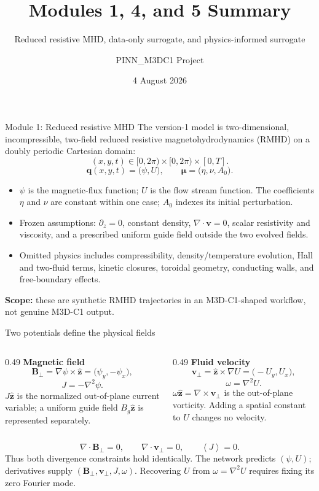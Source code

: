 \documentclass[aspectratio=169,11pt]{beamer}
\title{Modules 1, 4, and 5 Summary}
\subtitle{Reduced resistive MHD, data-only surrogate, and physics-informed surrogate}
\author{PINN\_M3DC1 Project}
\date{4 August 2026}
\newcommand{\average}[1]{\left\langle #1\right\rangle}
\newcommand{\vect}[1]{\bm{#1}}
\newcommand{\currentmodule}{Module 1}
\newcommand{\moduleprogress}{1 of 6}
\newcommand{\setmodule}[2]{%
  \renewcommand{\currentmodule}{#1}%
  \renewcommand{\moduleprogress}{#2}%
}
\begin{document}

\setmodule{Module 1}{1 of 6}
\begin{frame}{Module 1: Reduced resistive MHD}
The version-1 model is two-dimensional, incompressible, two-field reduced resistive magnetohydrodynamics (RMHD) on a doubly periodic Cartesian domain:
\[
(x,y,t)\in[0,2\pi)\times[0,2\pi)\times[0,T].
\]
\[
\vect{q}(x,y,t)=\bigl(\psi,U\bigr),
\qquad
\vect{\mu}=\bigl(\eta,\nu,A_0\bigr).
\]

\begin{itemize}
  \item $\psi$ is the magnetic-flux function; $U$ is the flow stream function.  The coefficients $\eta$ and $\nu$ are constant within one case; $A_0$ indexes its initial perturbation.
  \item Frozen assumptions: $\partial_z=0$, constant density, $\nabla\!\cdot\vect v=0$, scalar resistivity and viscosity, and a prescribed uniform guide field outside the two evolved fields.
  \item Omitted physics includes compressibility, density/temperature evolution, Hall and two-fluid terms, kinetic closures, toroidal geometry, conducting walls, and free-boundary effects.
\end{itemize}
\textcolor{WarningRed}{\textbf{Scope:}} these are synthetic RMHD trajectories in an M3D-C1-shaped workflow, not genuine M3D-C1 output.
\end{frame}

\setmodule{Module 1}{2 of 6}
\begin{frame}{Two potentials define the physical fields}
\begin{columns}[T,onlytextwidth]
\begin{column}{0.49\textwidth}
\textbf{Magnetic field}
\[
\vect{B}_{\perp}
=\nabla\psi\times\widehat{\vect{z}}
=\bigl(\psi_y,-\psi_x\bigr),
\]
\[
J=-\nabla^2\psi.
\]
$J\widehat{\vect z}$ is the normalized out-of-plane current variable; a uniform guide field $B_g\widehat{\vect z}$ is represented separately.
\end{column}
\begin{column}{0.49\textwidth}
\textbf{Fluid velocity}
\[
\vect{v}_{\perp}
=\widehat{\vect{z}}\times\nabla U
=\bigl(-U_y,U_x\bigr),
\]
\[
\omega=\nabla^2U.
\]
$\omega\widehat{\vect z}=\nabla\times\vect v_\perp$ is the out-of-plane vorticity.  Adding a spatial constant to $U$ changes no velocity.
\end{column}
\end{columns}

\[
\nabla\cdot\vect{B}_{\perp}=0,
\qquad
\nabla\cdot\vect{v}_{\perp}=0,
\qquad
\average{J}=0.
\]
Thus both divergence constraints hold identically. The network predicts $(\psi,U)$; derivatives supply $(\vect B_\perp,\vect v_\perp,J,\omega)$.  Recovering $U$ from $\omega=\nabla^2U$ requires fixing its zero Fourier mode.
\end{frame}
\end{document}
